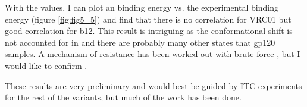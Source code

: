 With the \ec values, I can plot an \silico binding energy vs. the experimental binding energy (figure \ref{fig:fig5_5}) and find that there is no correlation for VRC01 but good correlation for b12. This result is intriguing as the conformational shift is not accounted for in \rosetta and there are probably many other states that gp120 samples. A mechanism of resistance has been worked out with brute force \citep{Li:2011ea}, but I would like to confirm \silico.

These results are very preliminary and would best be guided by ITC experiments for the rest of the variants, but much of the work has been done.